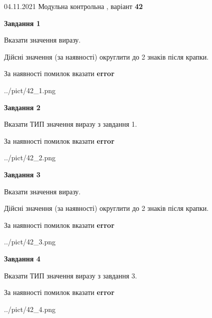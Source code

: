 \documentclass[11pt, ukrainian]{article}
\begin{document}
{04.11.2021 Модульна контрольна , варіант  \No \textbf { 42 }\par}
{
\begin {large}
{\begin {center}\textbf{Завдання 1}\end {center}}\par
Вказати значення виразу. \par
Дійсні значення (за наявності) округлити до 2 знаків після крапки. \par
За наявності помилок вказати \textbf{error}

\begin{center}
	{../pict/42_1.png}
\end{center}
\newpage

{\begin {center}\textbf{Завдання 2}\end {center}}\par
Вказати ТИП значення виразу з завдання 1. \par
За наявності помилок вказати \textbf{error}

\begin{center}
	{../pict/42_2.png}
\end{center}
\newpage

{\begin {center}\textbf{Завдання 3}\end {center}}\par
Вказати значення виразу. \par
Дійсні значення (за наявності) округлити до 2 знаків після крапки. \par
За наявності помилок вказати \textbf{error}

\begin{center}
	{../pict/42_3.png}
\end{center}
\newpage

{\begin {center}\textbf{Завдання 4}\end {center}}\par
Вказати ТИП значення виразу з завдання 3. \par
За наявності помилок вказати \textbf{error}

\begin{center}
	{../pict/42_4.png}
\end{center}
\newpage


\end{large}}
\end{document}
